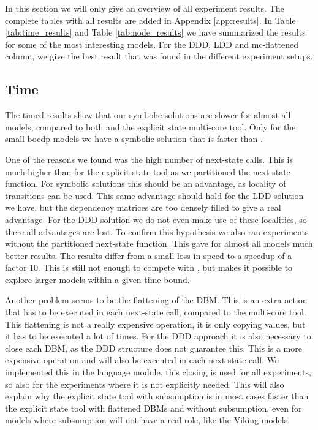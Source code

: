 In this section we will only give an overview of all experiment results. The complete tables with all results are added in Appendix \ref{app:results}. In Table \ref{tab:time_results} and Table \ref{tab:node_results} we have summarized the results for some of the most interesting models. For the DDD, LDD and mc-flattened column, we give the best result that was found in the different experiment setups. 

\subsection{Time}
The timed results show that our symbolic solutions are slower for almost all models, compared to both \uppaal{} and the explicit state multi-core tool. Only for the small bocdp models we have a symbolic solution that is faster than \uppaal{}. 

One of the reasons we found was the high number of next-state calls. This is much higher than for the explicit-state tool as we partitioned the next-state function. For symbolic solutions this should be an advantage, as locality of transitions can be used. This same advantage should hold for the LDD solution we have, but the dependency matrices are too densely filled to give a real advantage. For the DDD solution we do not even make use of these localities, so there all advantages are lost. To confirm this hypothesis we also ran experiments without the partitioned next-state function. This gave for almost all models much better results. The results differ from a small loss in speed to a speedup of a factor 10. This is still not enough to compete with \uppaal{}, but makes it possible to explore larger models within a given time-bound. 

Another problem seems to be the flattening of the DBM. This is an extra action that has to be executed in each next-state call, compared to the multi-core tool. This flattening is not a really expensive operation, it is only copying values, but it has to be executed a lot of times. For the DDD approach it is also necessary to close each DBM, as the DDD structure does not guarantee this. This is a more expensive operation and will also be executed in each next-state call. We implemented this in the language module, this closing is used for all experiments, so also for the experiments where it is not explicitly needed. This will also explain why the explicit state tool with subsumption is in most cases faster than the explicit state tool with flattened DBMs and without subsumption, even for models where subsumption will not have a real role, like the Viking models.

